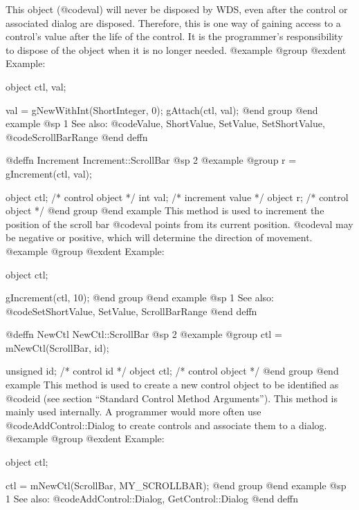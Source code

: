 This object (@code{val}) will never be disposed by WDS, even after
the control or associated dialog are disposed.  Therefore, this
is one way of gaining access to a control's value after the life
of the control.  It is the programmer's responsibility to dispose of
the object when it is no longer needed.
@example
@group
@exdent Example:

object  ctl, val;

val = gNewWithInt(ShortInteger, 0);
gAttach(ctl, val);
@end group
@end example
@sp 1
See also:  @code{Value, ShortValue, SetValue, SetShortValue,}
        @code{ScrollBarRange}
@end deffn










@deffn {Increment} Increment::ScrollBar
@sp 2
@example
@group
r = gIncrement(ctl, val);

object  ctl;   /*  control object  */
int     val;   /*  increment value */
object  r;     /*  control object  */
@end group
@end example
This method is used to increment the position of the scroll bar
@code{val} points from its current position.  @code{val} may
be negative or positive, which will determine the direction of movement.
@example
@group
@exdent Example:

object  ctl;

gIncrement(ctl, 10);
@end group
@end example
@sp 1
See also:  @code{SetShortValue, SetValue, ScrollBarRange}
@end deffn











@deffn {NewCtl} NewCtl::ScrollBar
@sp 2
@example
@group
ctl = mNewCtl(ScrollBar, id);

unsigned  id;   /*  control id      */
object   ctl;   /*  control object  */
@end group
@end example
This method is used to create a new control object to be identified as
@code{id} (see section ``Standard Control Method Arguments'').  This
method is mainly used internally.  A programmer would more often
use @code{AddControl::Dialog} to create controls and associate them
to a dialog.
@example
@group
@exdent Example:

object  ctl;

ctl = mNewCtl(ScrollBar, MY_SCROLLBAR);
@end group
@end example
@sp 1
See also:  @code{AddControl::Dialog, GetControl::Dialog}
@end deffn






